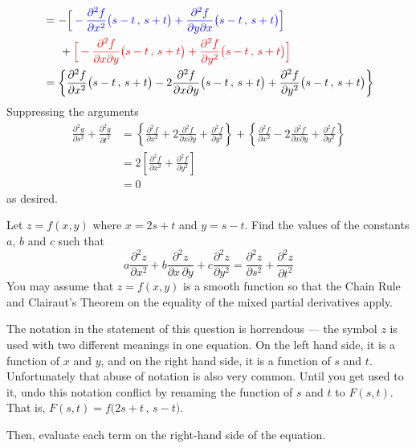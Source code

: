 \begin{solution}
\begin{align*}
  &= -\textcolor{blue}{\Big[-\frac{\partial^2 f}{\partial x^2} 
                                              \big(s-t\,,\,s+t\big)
     +\frac{\partial^2 f}{\partial y\partial x}\big(s-t\,,\,s+t\big)\Big]} \\
  &\hskip0.2in
  +\textcolor{red}{\Big[-\frac{\partial^2 f}{\partial x\partial y}                                                       \big(s-t\,,\,s+t\big)
    +\frac{\partial^2 f}{\partial y^2}\big(s-t\,,\,s+t\big) \Big]} \\
&=\left\{\frac{\partial^2 f}{\partial x^2}\big(s-t\,,\,s+t\big)
 - 2\frac{\partial^2 f}{\partial x\partial y}\big(s-t\,,\,s+t\big)
 +\frac{\partial^2 f}{\partial y^2}\big(s-t\,,\,s+t\big)\right\}
\end{align*}
Suppressing the arguments
\begin{align*}
\frac{\partial^2 g}{\partial s^2} + \frac{\partial^2 g}{\partial t^2}
&=\left\{\frac{\partial^2 f}{\partial x^2}
 + 2\frac{\partial^2 f}{\partial x\partial y}
 +\frac{\partial^2 f}{\partial y^2}\right\}
 +\left\{\frac{\partial^2 f}{\partial x^2}
 - 2\frac{\partial^2 f}{\partial x\partial y}
 +\frac{\partial^2 f}{\partial y^2}\right\} \\
&=2\left[\frac{\partial^2 f}{\partial x^2}
 +\frac{\partial^2 f}{\partial y^2}\right] \\
&=0
\end{align*}
as desired.
\end{solution}

\begin{question}[M200 2006A] %
Let $z = f(x,y)$ where $x = 2s + t$ and $y = s - t$. Find the values 
of the constants $a$, $b$ and $c$ such that
\begin{equation*}
a\frac{\partial^2 z}{\partial x^2}
+b\frac{\partial^2 z}{\partial x\,\partial y}
+c\frac{\partial^2 z}{\partial y^2}
=\frac{\partial^2 z}{\partial s^2}
+\frac{\partial^2 z}{\partial t^2}
\end{equation*}
You may assume that $z = f(x,y)$ is a smooth function so that the 
Chain Rule and Clairaut's Theorem on the equality of the 
mixed partial derivatives apply.
\end{question}

\begin{hint}
The notation in the statement of this question is horrendous --- 
the symbol $z$ is used with two different meanings in one equation.
On the left hand side, it is a function of $x$ and $y$, 
and on the right hand side, it is a function of $s$ and $t$.  
Unfortunately that abuse of notation is also very common. 
Until you get used to it, undo this notation conflict by renaming the 
function of $s$ and $t$ to $F(s,t)$. That is,
$
F(s,t) = f\big(2s+t\,,\,s-t\big)
$.

Then, evaluate each term on the right-hand side of the equation.
\end{hint}

